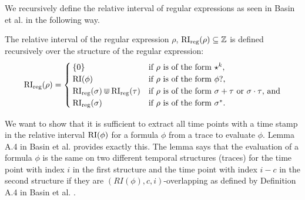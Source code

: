 We recursively define the relative interval of regular expressions as seen in Basin et al. \cite{Basin2020} in the following way.

\begin{definition}
    \label{def:rel-int-reg}
    The relative interval of the regular expression $\rho$, $\operatorname{RI}_{\text{reg}}(\rho) \subseteq \mathbb{Z}$ is defined recursively over the structure of the regular expression:
    \begin{equation*}
        \operatorname{RI}_{\text{reg}}(\rho) =
        \begin{cases}
            \{0\} & \text{if $\rho$ is of the form $\star^k$,} \\
            \operatorname{RI}(\phi) & \text{if $\rho$ is of the form $\phi?$,} \\
            \operatorname{RI}_{\text{reg}}(\sigma) \Cup \operatorname{RI}_{\text{reg}}(\tau) & \text{if $\rho$ is of the form $\sigma + \tau$ or $\sigma \cdot \tau$, and} \\
            \operatorname{RI}_{\text{reg}}(\sigma) & \text{if $\rho$ is of the form $\sigma^*$.}

        \end{cases}
    \end{equation*}
\end{definition}

We want to show that it is sufficient to extract all time points with a time stamp in the relative interval $\operatorname{RI}(\phi)$ for a formula $\phi$ from a trace to evaluate $\phi$.
Lemma A.4 in Basin et al. \cite{Basin2016} provides exactly this.
The lemma says that the evaluation of a formula $\phi$ is the same on two different temporal structures (traces) for the time point with index $i$ in the first structure and the time point with index $i-c$ in the second structure if they are $(RI(\phi),c,i)$-overlapping as defined by Definition A.4 in Basin et al. \cite{Basin2016}.

